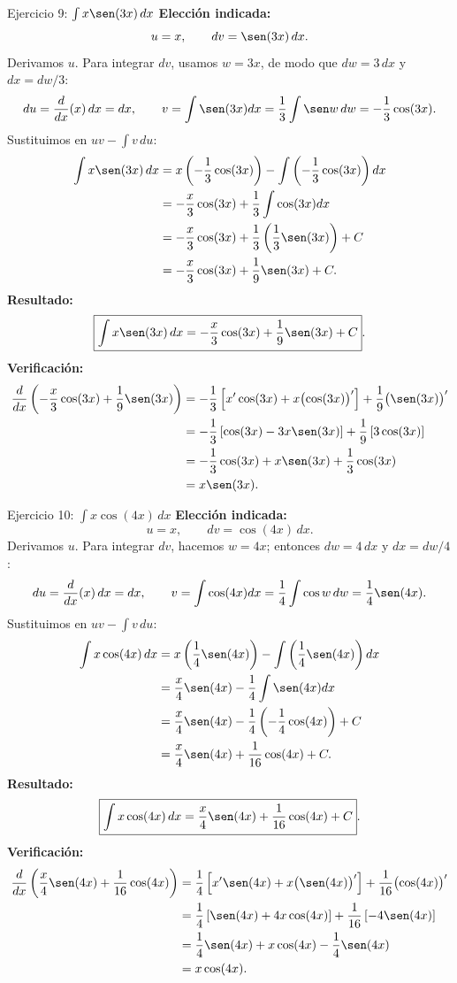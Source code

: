 \begin{examplebox}{Ejercicio 9: $\int x\sen(3x)\,dx$}
\textbf{Elección indicada:}
\[
 u=x,\qquad dv=\sen(3x)\,dx.
\]
Derivamos $u$. Para integrar $dv$, usamos $w=3x$, de modo que
$dw=3\,dx$ y $dx=dw/3$:
\[
 du=\frac{d}{dx}(x)\,dx=dx,
 \qquad
 v=\int\sen(3x)dx
 =\frac13\int\sen w\,dw
 =-\frac13\cos(3x).
\]
Sustituimos en $uv-\int v\,du$:
\begin{align*}
 \int x\sen(3x)\,dx
 &=x\left(-\frac13\cos(3x)\right)
   -\int\left(-\frac13\cos(3x)\right)dx\\
 &=-\frac{x}{3}\cos(3x)+\frac13\int\cos(3x)dx\\
 &=-\frac{x}{3}\cos(3x)
   +\frac13\left(\frac13\sen(3x)\right)+C\\
 &=-\frac{x}{3}\cos(3x)+\frac19\sen(3x)+C.
\end{align*}
\textbf{Resultado:}
\[
 \boxed{\int x\sen(3x)\,dx=-\frac{x}{3}\cos(3x)+\frac19\sen(3x)+C}.
\]
\textbf{Verificación:}
\begin{align*}
 \frac{d}{dx}\left(-\frac{x}{3}\cos(3x)+\frac19\sen(3x)\right)
 &=-\frac13\left[x'\cos(3x)+x\bigl(\cos(3x)\bigr)'\right]
   +\frac19\bigl(\sen(3x)\bigr)'\\
 &=-\frac13\left[\cos(3x)-3x\sen(3x)\right]
   +\frac19\left[3\cos(3x)\right]\\
 &=-\frac13\cos(3x)+x\sen(3x)+\frac13\cos(3x)\\
 &=x\sen(3x).
\end{align*}
\end{examplebox}

\begin{examplebox}{Ejercicio 10: $\int x\cos(4x)\,dx$}
\textbf{Elección indicada:}
\[
 u=x,\qquad dv=\cos(4x)\,dx.
\]
Derivamos $u$. Para integrar $dv$, hacemos $w=4x$; entonces
$dw=4\,dx$ y $dx=dw/4$:
\[
 du=\frac{d}{dx}(x)\,dx=dx,
 \qquad
 v=\int\cos(4x)dx
 =\frac14\int\cos w\,dw
 =\frac14\sen(4x).
\]
Sustituimos en $uv-\int v\,du$:
\begin{align*}
 \int x\cos(4x)\,dx
 &=x\left(\frac14\sen(4x)\right)
   -\int\left(\frac14\sen(4x)\right)dx\\
 &=\frac{x}{4}\sen(4x)-\frac14\int\sen(4x)dx\\
 &=\frac{x}{4}\sen(4x)
   -\frac14\left(-\frac14\cos(4x)\right)+C\\
 &=\frac{x}{4}\sen(4x)+\frac1{16}\cos(4x)+C.
\end{align*}
\textbf{Resultado:}
\[
 \boxed{\int x\cos(4x)\,dx=\frac{x}{4}\sen(4x)+\frac1{16}\cos(4x)+C}.
\]
\textbf{Verificación:}
\begin{align*}
 \frac{d}{dx}\left(\frac{x}{4}\sen(4x)+\frac1{16}\cos(4x)\right)
 &=\frac14\left[x'\sen(4x)+x\bigl(\sen(4x)\bigr)'\right]
   +\frac1{16}\bigl(\cos(4x)\bigr)'\\
 &=\frac14\left[\sen(4x)+4x\cos(4x)\right]
   +\frac1{16}\left[-4\sen(4x)\right]\\
 &=\frac14\sen(4x)+x\cos(4x)-\frac14\sen(4x)\\
 &=x\cos(4x).
\end{align*}
\end{examplebox}

